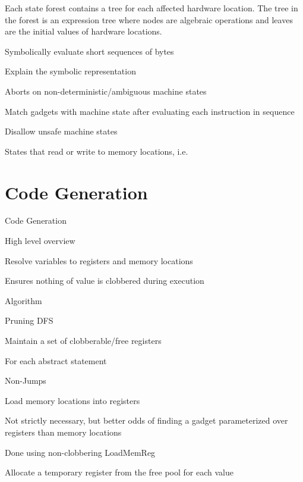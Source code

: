     Each state forest contains a tree for each affected hardware location.
    The tree in the forest is an expression tree where nodes are algebraic
    operations and leaves are the initial values of hardware locations.
    

                    Symbolically evaluate short sequences of bytes

                        Explain the symbolic representation

                        Aborts on non-deterministic/ambiguous machine states

                    Match gadgets with machine state after evaluating each
                    instruction in sequence

                        Disallow unsafe machine states

                        States that read or write to memory locations, i.e.
     
    \section{Code Generation}



            Code Generation

                High level overview

                    Resolve variables to registers and memory locations

                    Ensures nothing of value is clobbered during execution

                Algorithm

                    Pruning DFS

                    Maintain a set of clobberable/free registers

                    For each abstract statement

                        Non-Jumps

                            Load memory locations into registers

                                Not strictly necessary, but better odds of
                                finding a gadget parameterized over registers
                                than memory locations

                                Done using non-clobbering LoadMemReg

                                Allocate a temporary register from the free pool
                                for each value

